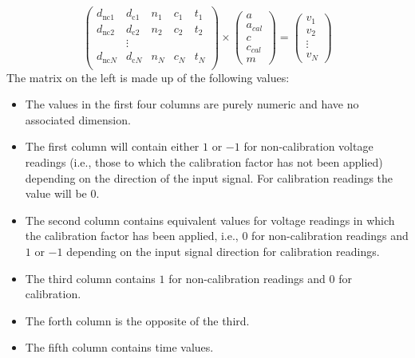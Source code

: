 \documentclass{IMEKO2024}
\begin{document}

\[
\begin{pmatrix*}
  d_{\textrm{nc}1} & d_{\textrm{c}1} & n_1 & c_1 & t_1  \\
  d_{\textrm{nc}2} & d_{\textrm{c}2} & n_2 & c_2 & t_2  \\
   & \vdots &  & & \\
  d_{\textrm{nc}N} & d_{\textrm{c}N} & n_N & c_N & t_N  \\
\end{pmatrix*}
\times
\begin{pmatrix}
  a \\
  a_{cal} \\ 
  c \\
  c_{cal} \\ 
  m
\end{pmatrix}
=
\begin{pmatrix}
  v_1 \\
  v_2 \\
  \vdots \\
  v_N
\end{pmatrix}
\]
%
The matrix on the left is made up of the following values:
%
\begin{itemize}
    \item The values in the first four columns are purely numeric and have no associated dimension.

    \item The first column will contain either $1$ or $-1$ for non-calibration voltage readings (i.e., those to which the calibration factor has not been applied) depending on the direction of the input signal. For calibration readings the value will be $0$.

    \item The second column contains equivalent values for voltage readings in which the calibration factor has been applied, i.e., $0$ for non-calibration readings and $1$ or $-1$ depending on the input signal direction for calibration readings.

    \item The third column contains $1$ for non-calibration readings and $0$ for calibration.

    \item The forth column is the opposite of the third.

    \item The fifth column contains time values.
\end{itemize}
\end{document}
